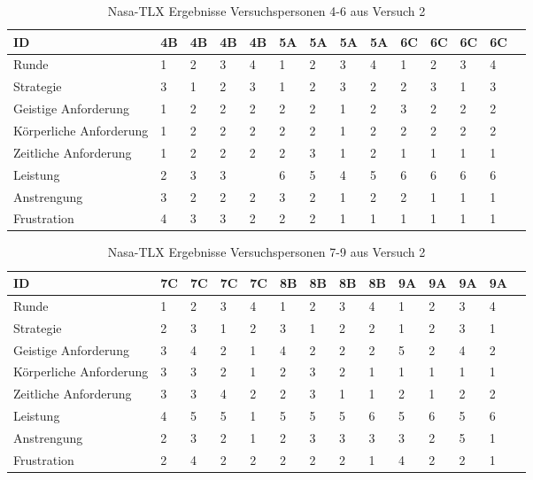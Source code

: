 \documentclass[12pt,a4paper]{scrartcl}
\begin{document}
\begin{appendix}
\begin{table}
\bigskip\bigskip  %
\caption{Nasa-TLX Ergebnisse Versuchspersonen 4-6 aus Versuch 2}

\smallskip
\begin{tabular}{|p{6cm}| p{0.8cm} | p{0.8cm} | p{0.8cm} | p{0.8cm} || p{0.8cm} | p{0.8cm} | p{0.8cm} | p{0.8cm} || p{0.8cm} | p{0.8cm} | p{0.8cm} | p{0.8cm} | p{} | }
\hline \hline
ID & 4B & 4B & 4B & 4B & 5A & 5A & 5A & 5A & 6C & 6C & 6C & 6C \\ \hline
Runde & 1 & 2 & 3 & 4 & 1 & 2 & 3 & 4 & 1 & 2 & 3 & 4 \\ \hline
	Strategie & 3 & 1 & 2 & 3 & 1 & 2 & 3 & 2 & 2 & 3 & 1 & 3 \\\hline \hline
	Geistige Anforderung & 1 & 2 & 2 & 2 & 2 & 2 & 1 & 2 & 3 & 2 & 2 & 2 \\ \hline
	Körperliche Anforderung & 1 & 2 & 2 & 2 & 2 & 2 & 1 & 2 & 2 & 2 & 2 & 2 \\ \hline
	Zeitliche Anforderung & 1 & 2 & 2 & 2 & 2 & 3 & 1 & 2 & 1 & 1 & 1 & 1 \\ \hline
	Leistung & 2 & 3 & 3 &  & 6 & 5 & 4 & 5 & 6 & 6 & 6 & 6 \\ \hline
	Anstrengung & 3 & 2 & 2 & 2 & 3 & 2 & 1 & 2 & 2 & 1 & 1 & 1 \\ \hline
	Frustration & 4 & 3 & 3 & 2 & 2 & 2 & 1 & 1 & 1 & 1 & 1 & 1 \\ \hline
\end{tabular}
\end{table}

\begin{table}
\caption{Nasa-TLX Ergebnisse Versuchspersonen 7-9 aus Versuch 2}

\smallskip
\begin{tabular}{|p{6cm}| p{0.8cm} | p{0.8cm} | p{0.8cm} | p{0.8cm} || p{0.8cm} | p{0.8cm} | p{0.8cm} | p{0.8cm} || p{0.8cm} | p{0.8cm} | p{0.8cm} | p{0.8cm} | p{} | }
\hline
	ID & 7C & 7C & 7C & 7C & 8B & 8B & 8B & 8B & 9A & 9A & 9A & 9A \\ \hline \hline
	Runde & 1 & 2 & 3 & 4 & 1 & 2 & 3 & 4 & 1 & 2 & 3 & 4 \\ \hline
	Strategie & 2 & 3 & 1 & 2 & 3 & 1 & 2 & 2 & 1 & 2 & 3 & 1 \\ \hline \hline
	Geistige Anforderung & 3 & 4 & 2 & 1 & 4 & 2 & 2 & 2 & 5 & 2 & 4 & 2 \\ \hline
	Körperliche Anforderung & 3 & 3 & 2 & 1 & 2 & 3 & 2 & 1 & 1 & 1 & 1 & 1 \\ \hline
	Zeitliche Anforderung & 3 & 3 & 4 & 2 & 2 & 3 & 1 & 1 & 2 & 1 & 2 & 2 \\ \hline
	Leistung & 4 & 5 & 5 & 1 & 5 & 5 & 5 & 6 & 5 & 6 & 5 & 6 \\ \hline
	Anstrengung & 2 & 3 & 2 & 1 & 2 & 3 & 3 & 3 & 3 & 2 & 5 & 1 \\ \hline
	Frustration & 2 & 4 & 2 & 2 & 2 & 2 & 2 & 1 & 4 & 2 & 2 & 1 \\ \hline
\end{tabular}


\end{table}
\end{appendix}
\end{document}
